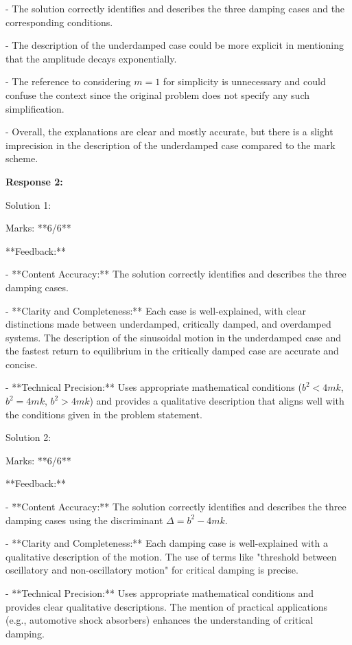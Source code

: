 \documentclass[a4paper,11pt]{article}
\begin{document}
- The solution correctly identifies and describes the three damping cases and the corresponding conditions.

- The description of the underdamped case could be more explicit in mentioning that the amplitude decays exponentially.

- The reference to considering \(m=1\) for simplicity is unnecessary and could confuse the context since the original problem does not specify any such simplification.

- Overall, the explanations are clear and mostly accurate, but there is a slight imprecision in the description of the underdamped case compared to the mark scheme.

\bigskip
\textbf{Response 2:}

Solution 1:

Marks: **6/6**

**Feedback:**

- **Content Accuracy:** The solution correctly identifies and describes the three damping cases.

- **Clarity and Completeness:** Each case is well-explained, with clear distinctions made between underdamped, critically damped, and overdamped systems. The description of the sinusoidal motion in the underdamped case and the fastest return to equilibrium in the critically damped case are accurate and concise.

- **Technical Precision:** Uses appropriate mathematical conditions (\(b^2 < 4mk\), \(b^2 = 4mk\), \(b^2 > 4mk\)) and provides a qualitative description that aligns well with the conditions given in the problem statement.

Solution 2:

Marks: **6/6**

**Feedback:**

- **Content Accuracy:** The solution correctly identifies and describes the three damping cases using the discriminant \(\Delta = b^2 - 4mk\).

- **Clarity and Completeness:** Each damping case is well-explained with a qualitative description of the motion. The use of terms like "threshold between oscillatory and non-oscillatory motion" for critical damping is precise.

- **Technical Precision:** Uses appropriate mathematical conditions and provides clear qualitative descriptions. The mention of practical applications (e.g., automotive shock absorbers) enhances the understanding of critical damping.
\end{document}
